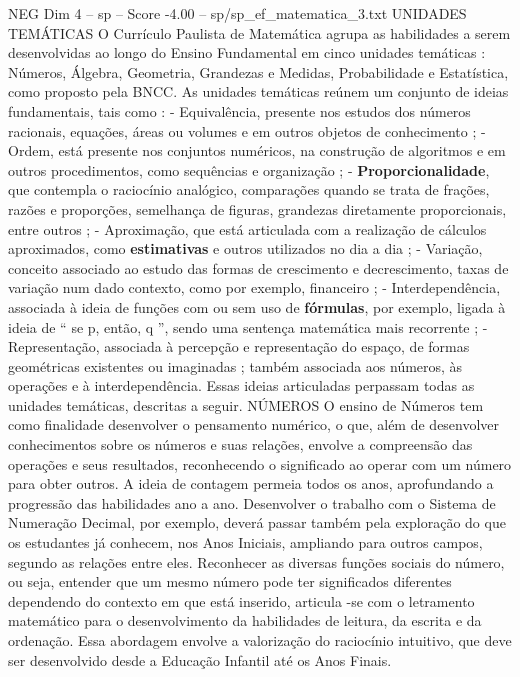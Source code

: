 \begin{textsample}{NEG Dim 4 – sp – Score -4.00 – sp/sp\_ef\_matematica\_3.txt}  \label{ex:f4_neg_031}
UNIDADES TEMÁTICAS O Currículo Paulista de Matemática agrupa as habilidades a serem desenvolvidas ao longo do Ensino Fundamental em cinco unidades temáticas : Números, Álgebra, Geometria, Grandezas e Medidas, Probabilidade e Estatística, como proposto pela BNCC.
As unidades temáticas reúnem um conjunto de ideias fundamentais, tais como : - Equivalência, presente nos estudos dos números racionais, equações, áreas ou volumes e em outros objetos de conhecimento ; - Ordem, está presente nos conjuntos numéricos, na construção de algoritmos e em outros procedimentos, como sequências e organização ; - \textbf{Proporcionalidade}, que contempla o raciocínio analógico, comparações quando se trata de frações, razões e proporções, semelhança de figuras, grandezas diretamente proporcionais, entre outros ; - Aproximação, que está articulada com a realização de cálculos aproximados, como \textbf{estimativas} e outros utilizados no dia a dia ; - Variação, conceito associado ao estudo das formas de crescimento e decrescimento, taxas de variação num dado contexto, como por exemplo, financeiro ; - Interdependência, associada à ideia de funções com ou sem uso de \textbf{fórmulas}, por exemplo, ligada à ideia de “ se p, então, q ”, sendo uma sentença matemática mais recorrente ; - Representação, associada à percepção e representação do espaço, de formas geométricas existentes ou imaginadas ; também associada aos números, às operações e à interdependência.
Essas ideias articuladas perpassam todas as unidades temáticas, descritas a seguir.
NÚMEROS O ensino de Números tem como finalidade desenvolver o pensamento numérico, o que, além de desenvolver conhecimentos sobre os números e suas relações, envolve a compreensão das operações e seus resultados, reconhecendo o significado ao operar com um número para obter outros.
A ideia de contagem permeia todos os anos, aprofundando a progressão das habilidades ano a ano.
Desenvolver o trabalho com o Sistema de Numeração Decimal, por exemplo, deverá passar também pela exploração do que os estudantes já conhecem, nos Anos Iniciais, ampliando para outros campos, segundo as relações entre eles.
Reconhecer as diversas funções sociais do número, ou seja, entender que um mesmo número pode ter significados diferentes dependendo do contexto em que está inserido, articula -se com o letramento matemático para o desenvolvimento da habilidades de leitura, da escrita e da ordenação.
Essa abordagem envolve a valorização do raciocínio intuitivo, que deve ser desenvolvido desde a Educação Infantil até os Anos Finais.

\end{textsample}
